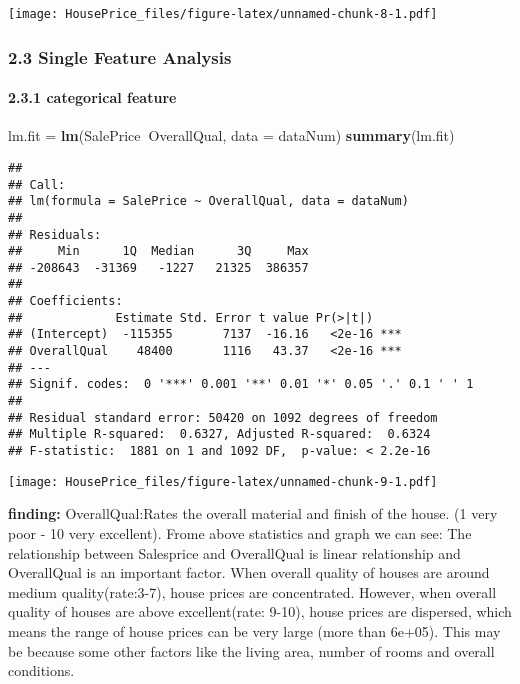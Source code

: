 \documentclass[]{article}
\newenvironment{Shaded}{\begin{snugshade}}{\end{snugshade}}
\newcommand{\KeywordTok}[1]{\textcolor[rgb]{0.13,0.29,0.53}{\textbf{#1}}}
\newcommand{\DataTypeTok}[1]{\textcolor[rgb]{0.13,0.29,0.53}{#1}}
\newcommand{\DecValTok}[1]{\textcolor[rgb]{0.00,0.00,0.81}{#1}}
\newcommand{\StringTok}[1]{\textcolor[rgb]{0.31,0.60,0.02}{#1}}
\newcommand{\OperatorTok}[1]{\textcolor[rgb]{0.81,0.36,0.00}{\textbf{#1}}}
\newcommand{\NormalTok}[1]{#1}
\let\oldparagraph\paragraph
\renewcommand{\paragraph}[1]{\oldparagraph{#1}\mbox{}}
\begin{document}
\texttt{[image: HousePrice\_files/figure-latex/unnamed-chunk-8-1.pdf]}

\subsubsection{2.3 Single Feature
Analysis}\label{single-feature-analysis}

\paragraph{2.3.1 categorical feature}\label{categorical-feature}

\begin{Shaded}
\begin{Highlighting}[]
\NormalTok{lm.fit =}\StringTok{ }\KeywordTok{lm}\NormalTok{(SalePrice}\OperatorTok{~}\NormalTok{OverallQual, }\DataTypeTok{data =}\NormalTok{ dataNum)}
\KeywordTok{summary}\NormalTok{(lm.fit) }
\end{Highlighting}
\end{Shaded}

\begin{verbatim}
## 
## Call:
## lm(formula = SalePrice ~ OverallQual, data = dataNum)
## 
## Residuals:
##     Min      1Q  Median      3Q     Max 
## -208643  -31369   -1227   21325  386357 
## 
## Coefficients:
##             Estimate Std. Error t value Pr(>|t|)    
## (Intercept)  -115355       7137  -16.16   <2e-16 ***
## OverallQual    48400       1116   43.37   <2e-16 ***
## ---
## Signif. codes:  0 '***' 0.001 '**' 0.01 '*' 0.05 '.' 0.1 ' ' 1
## 
## Residual standard error: 50420 on 1092 degrees of freedom
## Multiple R-squared:  0.6327, Adjusted R-squared:  0.6324 
## F-statistic:  1881 on 1 and 1092 DF,  p-value: < 2.2e-16
\end{verbatim}

\begin{Shaded}
\end{Shaded}

\texttt{[image: HousePrice\_files/figure-latex/unnamed-chunk-9-1.pdf]}

\textbf{finding:} OverallQual:Rates the overall material and finish of
the house. (1 very poor - 10 very excellent). Frome above statistics and
graph we can see: The relationship between Salesprice and OverallQual is
linear relationship and OverallQual is an important factor. When overall
quality of houses are around medium quality(rate:3-7), house prices are
concentrated. However, when overall quality of houses are above
excellent(rate: 9-10), house prices are dispersed, which means the range
of house prices can be very large (more than 6e+05). This may be because
some other factors like the living area, number of rooms and overall
conditions.
\end{document}
